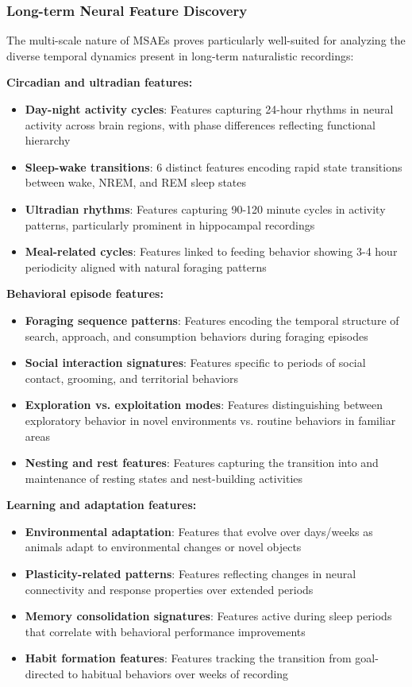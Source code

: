 \subsubsection{Long-term Neural Feature Discovery}

The multi-scale nature of MSAEs proves particularly well-suited for analyzing the diverse temporal dynamics present in long-term naturalistic recordings:

\textbf{Circadian and ultradian features:}
\begin{itemize}
\item \textbf{Day-night activity cycles}: Features capturing 24-hour rhythms in neural activity across brain regions, with phase differences reflecting functional hierarchy
\item \textbf{Sleep-wake transitions}: 6 distinct features encoding rapid state transitions between wake, NREM, and REM sleep states
\item \textbf{Ultradian rhythms}: Features capturing 90-120 minute cycles in activity patterns, particularly prominent in hippocampal recordings
\item \textbf{Meal-related cycles}: Features linked to feeding behavior showing 3-4 hour periodicity aligned with natural foraging patterns
\end{itemize}

\textbf{Behavioral episode features:}
\begin{itemize}
\item \textbf{Foraging sequence patterns}: Features encoding the temporal structure of search, approach, and consumption behaviors during foraging episodes
\item \textbf{Social interaction signatures}: Features specific to periods of social contact, grooming, and territorial behaviors
\item \textbf{Exploration vs. exploitation modes}: Features distinguishing between exploratory behavior in novel environments vs. routine behaviors in familiar areas
\item \textbf{Nesting and rest features}: Features capturing the transition into and maintenance of resting states and nest-building activities
\end{itemize}

\textbf{Learning and adaptation features:}
\begin{itemize}
\item \textbf{Environmental adaptation}: Features that evolve over days/weeks as animals adapt to environmental changes or novel objects
\item \textbf{Plasticity-related patterns}: Features reflecting changes in neural connectivity and response properties over extended periods
\item \textbf{Memory consolidation signatures}: Features active during sleep periods that correlate with behavioral performance improvements
\item \textbf{Habit formation features}: Features tracking the transition from goal-directed to habitual behaviors over weeks of recording
\end{itemize}

